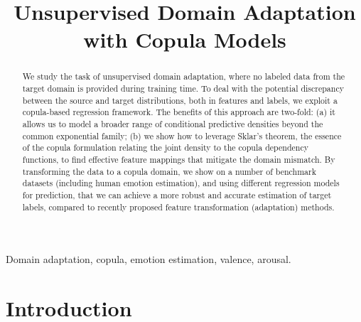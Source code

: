 \documentclass{article}
\title{Unsupervised Domain Adaptation with Copula Models}
\begin{document}
\newcommand*{\Scale}[2][4]{\scalebox{#1}{$#2$}}%
\newcommand*{\Resize}[2]{\resizebox{#1}{!}{$#2$}}%
	
	\maketitle
	\begin{abstract}
		We study the task of unsupervised domain adaptation, where no labeled data from the target domain is provided during training time. To deal with the potential discrepancy between the source and target distributions, both in features and labels, we exploit a copula-based regression framework.  The benefits of this approach are two-fold: (a) it allows us to model a broader range of conditional predictive densities beyond the common exponential family; (b) we show how to leverage Sklar's theorem, the essence of the copula formulation relating the joint density to the copula dependency functions, to find effective feature mappings that mitigate the domain mismatch. By transforming the data to a copula domain, we show on a number of benchmark datasets (including human emotion estimation), and using different regression models for prediction, that we can achieve a more robust and accurate estimation of target labels, compared to recently proposed feature transformation (adaptation) methods. 
        
        
		
		
	\end{abstract}
	\begin{keywords}
		Domain adaptation, copula, emotion estimation, valence, arousal.
	\end{keywords}
	\section{Introduction}
	\label{sec:intro}
	
\end{document}
